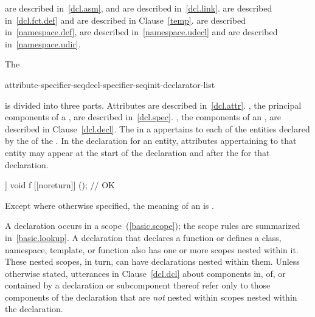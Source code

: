 \enternote
{} are described in~\ref{dcl.asm}, and
 are described in~\ref{dcl.link}.
 are described in~\ref{dcl.fct.def} and
 are described in Clause~\ref{temp}.
 are described in~\ref{namespace.def},
 are described in~\ref{namespace.udecl} and
 are described in~\ref{namespace.udir}.
\exitnote

The

\begin{ncsimplebnf}
attribute-specifier-seq\opt decl-specifier-seq\opt init-declarator-list\opt \terminal{;}
\end{ncsimplebnf}

is divided into three parts.
Attributes are described in~\ref{dcl.attr}.
, the principal components of
a , are described in~\ref{dcl.spec}.
, the components of an
, are described in Clause~\ref{dcl.decl}.
The  in a
 appertains to each of the entities declared by
the 
of the .
\enternote In the declaration for an entity, attributes appertaining to that
entity may appear at the start of the declaration and after the
 for that declaration.
\exitnote \enterexample
\begin{codeblock}
[[noreturn]] void f [[noreturn]] (); // OK
\end{codeblock}
\exitexample

Except where otherwise specified, the meaning of an 
is .

\pnum
{}%
%
A declaration occurs in a scope~(\ref{basic.scope}); the scope rules are
summarized in~\ref{basic.lookup}. A declaration that declares a function
or defines a class, namespace, template, or function also has one or
more scopes nested within it. These nested scopes, in turn, can have
declarations nested within them. Unless otherwise stated, utterances in
Clause~\ref{dcl.dcl} about components in, of, or contained by a
declaration or subcomponent thereof refer only to those components of
the declaration that are \emph{not} nested within scopes nested within
the declaration.

